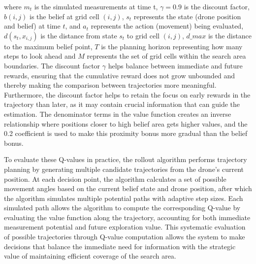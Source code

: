 \documentclass[../report.tex]{subfiles}
\begin{document}
    where $ m_t $ is the simulated measurements at time t, $\gamma = 0.9$ is the discount factor, $b(i,j)$ is the belief at grid cell $(i,j)$, $s_t$ represents the state 
    (drone position and belief) at time $t$, and $a_t$ represents the action (movement) being evaluated, $d(s_t, x_{i,j})$ is the distance from state $s_t$ to grid cell $(i,j)$,
    $d\_max$ is the distance to the maximum belief point, $T$ is the planning horizon representing how many steps to look ahead and $M$ represents the set of grid cells within the search area boundaries.
    The discount factor $\gamma$ helps balance between immediate and future rewards, ensuring that the cumulative reward does not grow unbounded and thereby making the 
    comparison between trajectories more meaningful. Furthermore, the discount factor helps to retain the focus on early rewards in the trajectory than later, as it may contain crucial 
    information that can guide the estimation. The denominator terms in the value function creates an inverse relationship where positions closer to high belief area gets 
    higher values, and the 0.2 coefficient is used to make this proximity bonus more gradual than the belief bonus. 

    To evaluate these Q-values in practice, the rollout algorithm performs trajectory planning by generating multiple candidate trajectories from the drone's current position. At each decision 
    point,  the algorithm calculates a set of possible movement angles based on the current belief state and drone position, after which the algorithm simulates multiple potential paths with 
    adaptive step sizes. Each simulated path allows the algorithm to compute the corresponding Q-value by evaluating the value function along the trajectory, accounting for both immediate 
    measurement potential and future exploration value. This systematic evaluation of possible trajectories through Q-value computation allows the system to make decisions that balance the 
    immediate need for information with the strategic value of maintaining efficient coverage of the search area.
\end{document}
